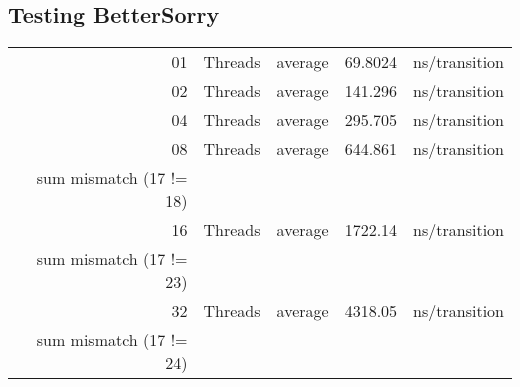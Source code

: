 \documentclass[11pt]{article}
\begin{document}
\subsection{Testing BetterSorry}
\label{sec-7-2}

\begin{center}
\begin{tabular}{rllrl}
01 & Threads & average & 69.8024 & ns/transition\\
02 & Threads & average & 141.296 & ns/transition\\
04 & Threads & average & 295.705 & ns/transition\\
08 & Threads & average & 644.861 & ns/transition\\
sum mismatch (17 != 18) &  &  &  & \\
16 & Threads & average & 1722.14 & ns/transition\\
sum mismatch (17 != 23) &  &  &  & \\
32 & Threads & average & 4318.05 & ns/transition\\
sum mismatch (17 != 24) &  &  &  & \\
\end{tabular}
\end{center}
\end{document}
